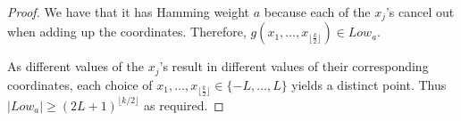 \documentclass[11pt]{article}
\begin{document}
\begin{proof}
    We have that it has Hamming weight $a$ 
    because each of the $x_j$'s cancel out when adding up the coordinates. Therefore, $g(x_1, \ldots, x_{\lfloor \frac{k}{2} \rfloor}) \in Low_a$.

As different values of the $x_j$'s result in different values of their corresponding coordinates, each choice of $x_1, \ldots, x_{\lfloor \frac{k}{2} \rfloor} \in \{-L, \ldots, L\}$ yields a distinct point. Thus $|Low_a| \geq (2L+1)^{\lfloor k/2 \rfloor}$ as required.
\end{proof}


\lemmarandomspineunlikelyhitvertex*
 
\end{document}
